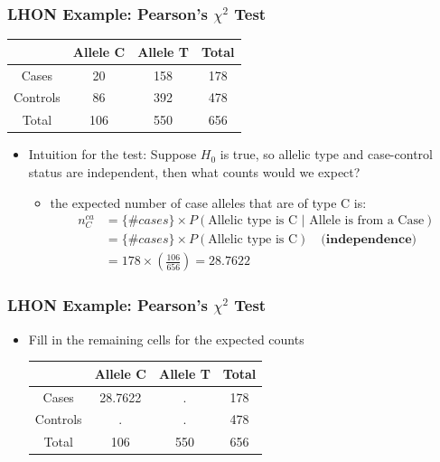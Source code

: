\documentclass{beamer}
\begin{document}
\begin{frame}
\frametitle{\bf LHON Example: Pearson's $\chi^2$  Test }
  \begin{center}
      \begin{tabular}{|c|cc|c|}
        \hline
         & Allele C  &  Allele T& Total\\
\hline
Cases & 20 & 158 & 178   \\
Controls &86& 392 &478 \\
\hline
Total& 106&550& 656 \\
 \hline
      \end{tabular}
    \end{center}
\begin{itemize}
\item Intuition for the test: Suppose $H_0$ is true, so allelic type and case-control status are independent, then what counts would we expect?
\begin{itemize}
\item the expected number of case alleles that are of type C is:
\begin{align*}
n^{ca}_C &= \{\#cases\} \times P(\mbox{Allelic type is C  \(|\)  Allele is from a Case}) \\
&=  \{\#cases\}  \times P(\mbox{Allelic type is C}) \quad \textbf{(independence)}\\
&=178\times \left(\frac{106}{656}\right)=28.7622
\end{align*}
\end{itemize}
\end{itemize}
\end{frame}


\begin{frame}
\frametitle{\bf LHON Example: Pearson's $\chi^2$ Test }
 \begin{itemize}
\item Fill in the remaining cells for the expected counts
  \begin{center}
      \begin{tabular}{|c|cc|c|}
        \hline
         & Allele C  &  Allele T& Total\\
\hline
Cases & 28.7622 & . & 178   \\
Controls &.& . &478 \\
\hline
Total& 106&550& 656 \\
 \hline
      \end{tabular}
    \end{center}
 \end{itemize}
\end{frame}
\end{document}

